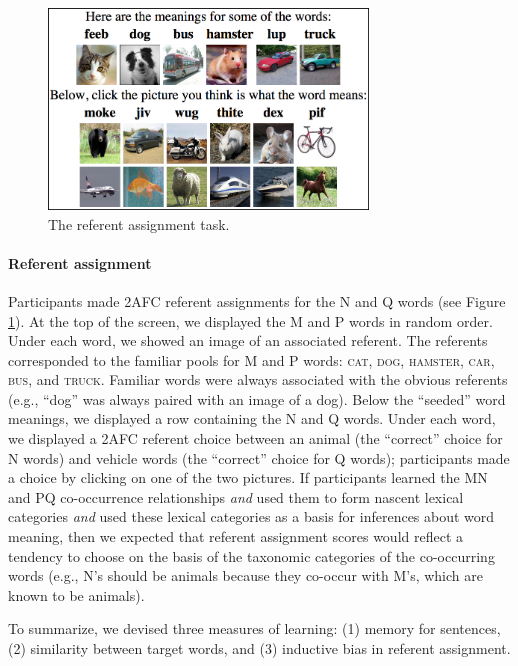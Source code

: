 \documentclass[man,floatsintext]{apa6}
\begin{document}
\begin{figure}[t]
  \begin{center}
    \includegraphics[width=8.5cm]{meaning-html-cropped.png}
    \caption{The referent assignment task.}
    \label{meaning-task}
  \end{center}
\end{figure}

\paragraph{Referent assignment}
Participants made 2AFC referent assignments for the N and Q words (see Figure \ref{meaning-task}). At the top of the screen, we displayed the M and P words in random order. Under each word, we showed an image of an associated referent. The referents corresponded to the familiar pools for M and P words: \textsc{cat}, \textsc{dog}, \textsc{hamster}, \textsc{car}, \textsc{bus}, and \textsc{truck}. Familiar words were always associated with the obvious referents (e.g., ``dog'' was always paired with an image of a dog). Below the ``seeded'' word meanings, we displayed a row containing the N and Q words. Under each word, we displayed a 2AFC referent choice between an animal (the ``correct'' choice for N words) and vehicle words (the ``correct'' choice for Q words); participants made a choice by clicking on one of the two pictures. If participants learned the MN and PQ co-occurrence relationships \emph{and} used them to form nascent lexical categories \emph{and} used these lexical categories as a basis for inferences about word meaning, then we expected that referent assignment scores would reflect a tendency to choose on the basis of the taxonomic categories of the co-occurring words (e.g., N's should be animals because they co-occur with M's, which are known to be animals).

To summarize, we devised three measures of learning: (1) memory for sentences, (2) similarity between target words, and (3) inductive bias in referent assignment.
\end{document}
